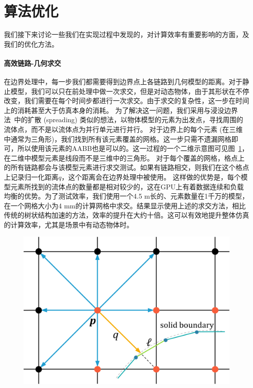 \section{算法优化}
\label{sec:sig23_alg_optimal}
我们接下来讨论一些我们在实现过程中发现的，对计算效率有重要影响的方面，及我们的优化方法。

\paragraph{高效链路-几何求交}
在边界处理中，每一步我们都需要得到边界点上各链路到几何模型的距离。对于静止模型，我们可以只在前处理中做一次求交，但是对动态物体，由于其形状在不停改变，我们需要在每个时间步都进行一次求交。由于求交的复杂性，这一步在时间上的消耗甚至大于仿真本身的消耗。
为了解决这一问题，我们采用与浸没边界法~\cite{Chen-2021}中的扩散 (spreading) 类似的想法，以物体模型的元素为出发点，寻找周围的流体点，而不是以流体点为并行单元进行并行。
对于边界上的每个元素 (在三维中通常为三角形)，我们找到所有该元素覆盖的网格。这一步只需不遗漏网格即可，所以使用该元素的AABB也是可以的。这一过程的一个二维示意图可见图~\ref{img:intersection}，在二维中模型元素是线段而不是三维中的三角形。
对于每个覆盖的网格，格点上的所有链路都会与该模型元素进行求交测试。如果有链路相交，则我们在这个格点上记录归一化距离$q$，这个距离会在边界处理中被使用。
这样做的优势是，每个模型元素所找到的流体点的数量都是相对较少的，这在GPU上有着数据连续和负载均衡的优势。为了测试效率，我们使用一个4.5 m长的、元素数量在1千万的模型，在一个网格大小为4 mm的计算网格中求交。结果显示使用上述的求交方法，相比传统的树状结构加速的方法，效率的提升在大约十倍。这可以有效地提升整体仿真的计算效率，尤其是场景中有动态物体时。

\begin{figure}[htb]
  \centering
    \includegraphics[width=0.7\columnwidth]{figures/intersection.png}
  \label{img:intersection}
\end{figure}

